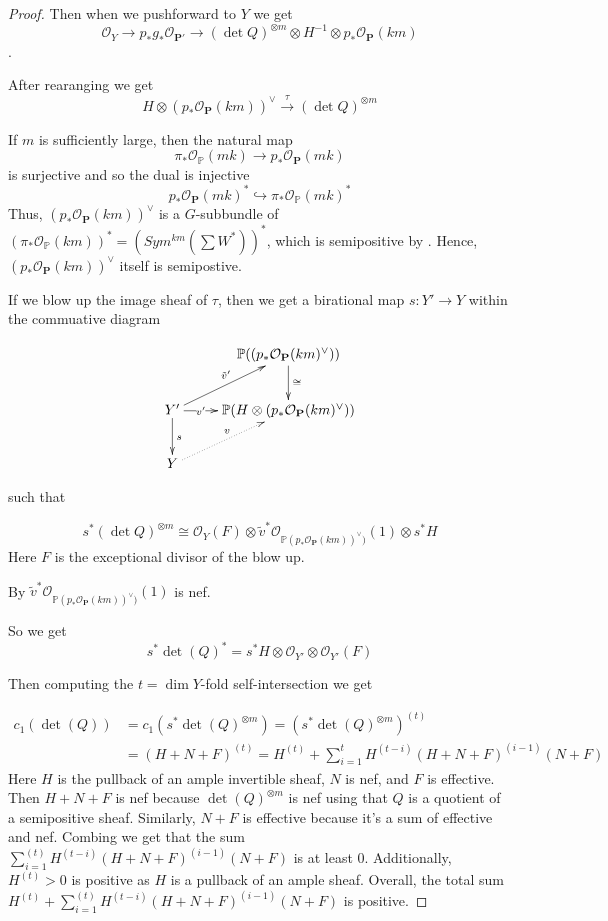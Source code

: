 \begin{proof}
Then when we pushforward to $Y$ we get $$\mathcal{O}_Y\to p_*g_*\mathcal{O}_{\mathbf{P}'}\to (\det Q)^{\otimes m}\otimes H^{-1}\otimes p_*\mathcal{O}_{\mathbf{P}}(km)$$ .

After rearanging we get $$H\otimes (p_*\mathcal{O}_{\mathbf{P}}(km))^{\vee}\stackrel{\tau}\to (\det Q)^{\otimes m}$$ 

If $m$ is sufficiently large, then the natural map $$\pi_*\mathcal{O}_{\mathbb{P}}(mk)\to p_*\mathcal{O}_{\mathbf{P}}(mk)$$ is surjective and so the dual is injective $$p_*\mathcal{O}_{\mathbf{P}}(mk)^*\hookrightarrow \pi_*\mathcal{O}_{\mathbb{P}}(mk)^*$$ Thus, $(p_*\mathcal{O}_{\mathbf{P}}(km))^{\vee}$ is a $G$-subbundle  of $(\pi_*\mathcal{O}_{\mathbb{P}}(km))^*=(Sym^{km}(\sum W^*))^*$, which is semipositive by . Hence, $(p_*\mathcal{O}_{\mathbf{P}}(km))^{\vee}$  itself is semipostive. 

If we blow up the image sheaf of $\tau$, then we get a birational map $s:Y'\to Y$ within the commuative diagram
 
$$\xymatrix{
&\mathbb{P}((p_*\mathcal{O}_{\mathbf{P}}(km)^{\vee})) \ar[d]^{\cong}\\
Y'  \ar[r]|-{v'} \ar[ru]^{\tilde{v}'} \ar[d]^s &\mathbb{P}(H\otimes (p_*\mathcal{O}_{\mathbf{P}}(km)^{\vee})) \\
Y \ar@{.>}[ru]^v &
}$$ 

such that 

$$s^*(\det Q)^{\otimes m}\cong \mathcal{O}_Y(F)\otimes \tilde{v}^*\mathcal{O}_{\mathbb{P}(p_*\mathcal{O}_{\mathbf{P}}(km))^{\vee})}(1)\otimes s^*H$$  Here $F$ is the exceptional divisor of the blow up.

By  $\tilde{v}^*\mathcal{O}_{\mathbb{P}(p_*\mathcal{O}_{\mathbf{P}}(km))^{\vee})}(1)$ is nef. 
  
So we get   
$$s^*\det(Q)^*=s^*H\otimes \mathcal{O}_{Y'}\otimes \mathcal{O}_{Y'}(F)$$   

Then computing the $t=\dim Y$-fold self-intersection we get 

\begin{align*}
c_1(\det(Q)) & =c_1(s^*\det(Q)^{\otimes m})=(s^*\det(Q)^{\otimes m})^{(t)}\\ & =(H+N+F)^{(t)}=H^{(t)}+\sum\limits_{i=1}^{t} H^{(t-i)}(H+N+F)^{(i-1)}(N+F)
\end{align*} 
 Here $H$ is the pullback of an ample invertible sheaf, $N$ is nef, and $F$ is effective. Then $H+N+F$ is nef because $\det(Q)^{\otimes m}$ is nef using that $Q$ is a quotient of a semipositive sheaf.  Similarly, $N+F$ is effective because it's a sum of effective and nef. Combing we get that the sum $\sum\limits_{i=1}^{(t)} H^{(t-i)}(H+N+F)^{(i-1)}(N+F)$ is at least 0. Additionally, $H^{(t)}>0$ is positive as $H$ is a pullback of an ample sheaf. Overall, the total sum $H^{(t)}+\sum\limits_{i=1}^{(t)} H^{(t-i)}(H+N+F)^{(i-1)}(N+F)$ is positive. 


  
\end{proof}





